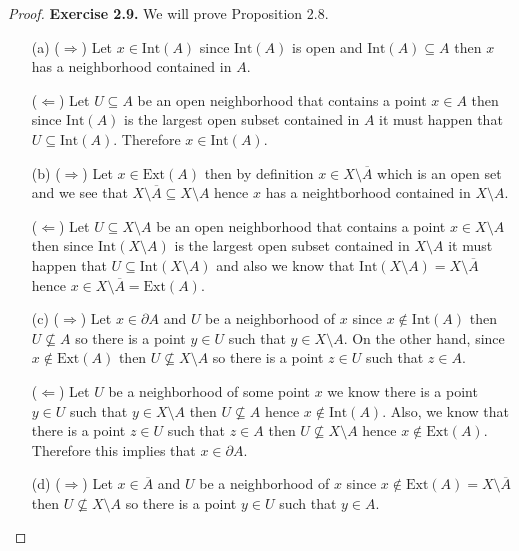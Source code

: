 \documentclass[11pt]{article}
\newcommand{\inter}{\text{Int}}
\newcommand{\ext}{\text{Ext}}
\newcommand{\setmin}{\setminus}
\theoremstyle{definition}
\begin{document}
\begin{proof}{\textbf{Exercise 2.9.}}
    We will prove Proposition 2.8.
    \begin{itemize}
        \item [(a)]
        ($\Rightarrow$) Let $x \in \inter(A)$ since $\inter(A)$ is open
        and $\inter(A) \subseteq A$
        then $x$ has a neighborhood contained in $A$.

        ($\Leftarrow$) Let $U \subseteq A$ be an open neighborhood that
        contains a point $x \in A$ then since $\inter(A)$ is the largest
        open subset contained in $A$ it must happen that
        $U \subseteq \inter(A)$. Therefore
        $x \in \inter(A)$.

        \item [(b)]
        ($\Rightarrow$) Let $x \in \ext(A)$ then by definition
        $x \in X \setminus \overline{A}$ which is an open set
        and we see that $X \setminus \overline{A} \subseteq X \setminus A$
        hence $x$ has a neightborhood contained in $X\setminus A$.

        ($\Leftarrow$) Let $U \subseteq X \setmin A$ be an open neighborhood
        that contains a point $x \in X \setmin A$
        then since $\inter(X \setmin A)$ is
        the largest open subset contained in $X \setmin A$ it must happen that
        $U \subseteq \inter(X \setmin A)$ and also 
        we know that $\inter(X \setmin A) = X \setmin \overline{A}$ hence 
        $x \in X \setmin \overline{A} = \ext(A)$.

        \item [(c)]
        ($\Rightarrow$) Let $x \in \partial A$ and $U$ be a neighborhood of $x$
        since $x \not\in \inter(A)$ then $U \not\subseteq A$ so there is a
        point $y \in U$ such that $y \in X \setmin A$. On the other hand,
        since $x \not\in \ext(A)$ then $U \not\subseteq X \setmin A$ so there
        is a point $z \in U$ such that $z \in A$.

        ($\Leftarrow$) Let $U$ be a neighborhood of some point $x$ we know
        there is a point $y \in U$ such that $y \in X \setmin A$ then
        $U \not\subseteq A$ hence $x \not\in \inter(A)$. Also, we know that 
        there is a point $z \in U$ such that $z \in A$ then
        $U \not\subseteq X \setmin A$ hence $x \not\in \ext(A)$. Therefore
        this implies that $x \in \partial A$.

        \item [(d)]
        ($\Rightarrow$) Let $x \in \overline{A}$ and $U$ be a neighborhood of
        $x$ since $x \not\in \ext(A) = X \setmin \overline{A}$ then
        $U \not\subseteq X \setmin A$ so there is a point $y \in U$
        such that $y \in A$.


\end{itemize}
\end{proof}
\end{document}

